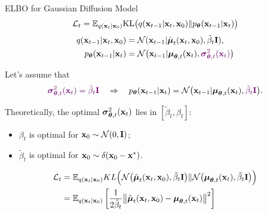 \documentclass{beamer}
\renewcommand{\eqpause}{}
\renewcommand{\nextonslide}[1]{#1}
\begin{document}
\begin{frame}{ELBO for Gaussian Diffusion Model}
    \[
        \mathcal{L}_t = \mathbb{E}_{q(\mathbf{x}_t | \mathbf{x}_0)} \mathrm{KL} \bigl(q(\mathbf{x}_{t-1} | \mathbf{x}_t, \mathbf{x}_0) \| p_{\boldsymbol{\theta}}(\mathbf{x}_{t-1} | \mathbf{x}_t)\bigr)
    \]
    \vspace{-0.7cm}
    \begin{align*}
        q(\mathbf{x}_{t-1} | \mathbf{x}_t, \mathbf{x}_0) &= \mathcal{N}(\mathbf{x}_{t-1} | \tilde{\boldsymbol{\mu}}_t(\mathbf{x}_t, \mathbf{x}_0), \tilde{\beta}_t \mathbf{I}), \\
        p_{\boldsymbol{\theta}}(\mathbf{x}_{t - 1} | \mathbf{x}_t) &= \mathcal{N} \bigl(\mathbf{x}_{t - 1} | \boldsymbol{\mu}_{\boldsymbol{\theta}, t}(\mathbf{x}_t), {\color{violet}\boldsymbol{\sigma}_{\boldsymbol{\theta}, t}^2(\mathbf{x}_t)}\bigr)
    \end{align*}
    \eqpause
    Let's assume that
    \[
        {\color{violet}\boldsymbol{\sigma}_{\boldsymbol{\theta}, t}^2(\mathbf{x}_t) = \tilde{\beta}_t \mathbf{I}} \quad \Rightarrow \quad p_{\boldsymbol{\theta}}(\mathbf{x}_{t - 1} | \mathbf{x}_t) = \mathcal{N} \bigl(\mathbf{x}_{t - 1} | \boldsymbol{\mu}_{\boldsymbol{\theta}, t}(\mathbf{x}_t), {\color{violet}\tilde{\beta}_t \mathbf{I}} \bigr).
    \]
    \eqpause
    Theoretically, the optimal $\boldsymbol{\sigma}_{\boldsymbol{\theta}, t}^2(\mathbf{x}_t)$ lies in $[\tilde{\beta}_t, \beta_t]$:
    \begin{itemize}
        \item $\beta_t$ is optimal for $\mathbf{x}_0 \sim \mathcal{N}(0, \mathbf{I})$;
        \item $\tilde{\beta}_t$ is optimal for $\mathbf{x}_0 \sim \delta(\mathbf{x}_0 - \mathbf{x}^*)$.
    \end{itemize}
    \eqpause
    \begin{align*}
        \cL_t &= \bbE_{q(\bx_t | \bx_0)} KL\Bigl(\cN\bigl(\tilde{\bmu}_t(\bx_t, \bx_0), \tilde{\beta}_t \bI \bigr) \| \cN\bigl(\bmu_{\btheta, t}(\bx_t), \tilde{\beta}_t \bI\bigr)\Bigr) \\ 
        \nextonslide{&= \bbE_{q(\bx_t | \bx_0)} \left[\frac{1}{2\tilde{\beta}_t} \bigl\| \tilde{\bmu}_t(\bx_t, \bx_0) - \bmu_{\btheta, t}(\bx_t) \bigr\|^2  \right]}
    \end{align*}
\end{frame}
\end{document}
